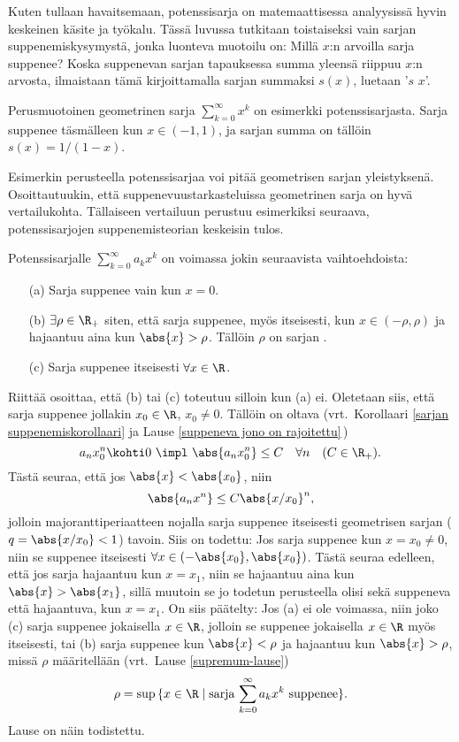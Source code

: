 Kuten tullaan havaitsemaan, potenssisarja on matemaattisessa analyysissä hyvin keskeinen käsite
ja työkalu. Tässä luvussa tutkitaan toistaiseksi vain sarjan suppenemiskysymystä, jonka luonteva
muotoilu on: Millä $x$:n arvoilla sarja suppenee? Koska suppenevan sarjan tapauksessa summa 
yleensä riippuu $x$:n arvosta, ilmaistaan tämä kirjoittamalla sarjan summaksi $s(x)$, luetaan
'$s$ $x$'.
\begin{Exa} Perusmuotoinen geometrinen sarja $\sum_{k=0}^\infty x^k$ on esimerkki 
potenssisarjasta. Sarja suppenee täsmälleen kun $x \in (-1,1)$, ja sarjan summa on tällöin 
$s(x) = 1/(1-x)$. \loppu 
\end{Exa}
Esimerkin perusteella potenssisarjaa voi pitää geometrisen sarjan yleistyksenä. Osoittautuukin,
että suppenevuustarkasteluissa geometrinen sarja on hyvä vertailukohta. Tällaiseen vertailuun 
perustuu esimerkiksi seuraava, potenssisarjojen suppenemisteorian keskeisin tulos.
\begin{Lause}  \label{suppenemissäde} Potenssisarjalle 
$\sum_{k=0}^\infty a_k x^k$ on voimassa jokin seuraavista vaihtoehdoista:
\begin{itemize}
\item[(a)] Sarja suppenee vain kun $x=0$.
\item[(b)] $\exists \rho\in\R_+$ siten, että sarja suppenee, myös itseisesti, kun 
           $x\in (-\rho,\rho)$ ja hajaantuu aina kun $\abs{x}>\rho$. Tällöin $\rho$ on sarjan
           .
\item[(c)] Sarja suppenee itseisesti $\forall x\in\R$.
\end{itemize}
\end{Lause}
\tod Riittää osoittaa, että (b) tai (c) toteutuu silloin kun (a) ei. Oletetaan siis, että sarja
suppenee jollakin $x_0 \in \R$, $x_0 \neq 0$. Tällöin on oltava (vrt.\ Korollaari 
\ref{sarjan suppenemiskorollaari} ja Lause \ref{suppeneva jono on rajoitettu}\,)
\[
a_nx_0^n\kohti 0 \ \impl \ \abs{a_nx_0^n}\leq C\quad \forall n \quad (C\in\R_+).
\]
Tästä seuraa, että jos $\abs{x}<\abs{x_0}$, niin
\[
\abs{a_nx^n}\leq C\abs{x/x_0}^n,
\]
jolloin majoranttiperiaatteen nojalla sarja suppenee itseisesti geometrisen sarjan 
($q=\abs{x/x_0}<1$) tavoin. Siis on todettu: Jos sarja suppenee kun $x=x_0\neq 0$, niin se 
suppenee itseisesti $\forall x\in (-\abs{x_0},\abs{x_0})$. Tästä seuraa edelleen, että jos sarja
hajaantuu kun $x=x_1$, niin se hajaantuu aina kun $\abs{x}>\abs{x_1}$, sillä muutoin se jo 
todetun perusteella olisi sekä suppeneva että hajaantuva, kun $x=x_1$. On siis päätelty: Jos (a)
ei ole voimassa, niin joko (c) sarja suppenee jokaisella $x \in \R$, jolloin se suppenee 
jokaisella $x \in \R$ myös itseisesti, tai (b) sarja suppenee kun $\abs{x} < \rho$ ja hajaantuu
kun $\abs{x} > \rho$, missä $\rho$ määritellään (vrt.\ Lause \ref{supremum-lause})
\[
\rho=\sup\,\{x \in \R \mid \text{sarja $\sum_{k=0}^\infty a_k x^k$ suppenee}\}.
\]
Lause on näin todistettu. \loppu

